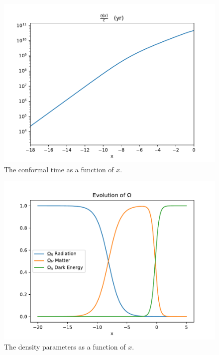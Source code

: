 \documentclass{aa}
\begin{document}
\begin{figure}[H]
   \includegraphics[scale=0.6]{../figures/milestone1/eta_x.pdf}
   \caption{The conformal time as a function of $x$.}\label{fig:M1_eta_x}
\end{figure}

\begin{figure}[H]
   \includegraphics[scale=0.6]{../figures/milestone1/Omegas.pdf}
   \caption{The density parameters as a function of $x$.}\label{fig:M1_Omegas}
\end{figure}
\end{document}
